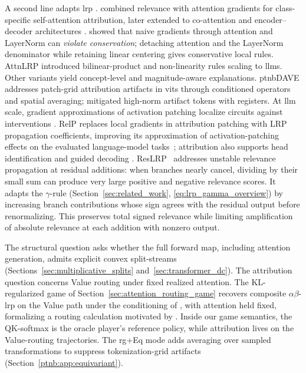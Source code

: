 A second line adapts \ac{lrp} \parencite{Bach2015}. \textcite{Chefer2021GenericAttention} combined relevance with attention gradients for class-specific self-attention attribution, later extended to co-attention and encoder--decoder architectures \parencite{Chefer2021ICCV}. \textcite{Ali2022AttnLRP} showed that naive gradients through attention and LayerNorm can \emph{violate conservation}; detaching attention and the LayerNorm denominator while retaining linear centering gives conservative local rules. AttnLRP \parencite{Achtibat2024AttnLRP} introduced bilinear-product and non-linearity rules scaling to \acp{llm}. Other variants yield concept-level \parencite{Achtibat2023CRP} and magnitude-aware \parencite{vukadin2024abslrp} explanations. \ac{ptnbDAVE} \parencite{Wrobel2024} addresses patch-grid attribution artifacts in \acp{vit} \parencite{Dosovitskiy2021vit} through conditioned operators and spatial averaging; \textcite{darcet2024vision} mitigated high-norm artifact tokens with registers. At \ac{llm} scale, gradient approximations of activation patching \parencite{Syed2024AttributionPatching,Kramar2024AtPStar} localize circuits against interventions \parencite{Hanna2024Faithfulness}. RelP replaces local gradients in attribution patching with LRP propagation coefficients, improving its approximation of activation-patching effects on the evaluated language-model tasks~\parencite{Jafari2025RelP}; attribution also supports head identification and guided decoding \parencite{Kahardipraja2025Atlas,Komorowski2026AGD}.
ResLRP~\parencite[Section~4.1 and Appendix~A.2]{Berend2026ResLRP} addresses unstable relevance propagation at residual additions: when branches nearly cancel, dividing by their small sum can produce very large positive and negative relevance scores. It adapts the $\gamma$-rule (Section~\ref{sec:related_work}, \eqref{eq:lrp_gamma_overview}) by increasing branch contributions whose sign agrees with the residual output before renormalizing. This preserves total signed relevance while limiting amplification of absolute relevance at each addition with nonzero output.

The structural question asks whether the full forward map, including attention generation, admits explicit convex split-streams (Sections~\ref{sec:multiplicative_splits} and~\ref{sec:transformer_dc}). The attribution question concerns Value routing under fixed realized attention. The KL-regularized game of Section~\ref{sec:attention_routing_game} recovers composite $\alpha\beta$-\ac{lrp} on the Value path under the conditioning of \textcite{Ali2022AttnLRP}, with attention held fixed, formalizing a routing calculation motivated by \textcite{Abnar2020attention}. Inside our game semantics, the QK-softmax is the oracle player's reference policy, while attribution lives on the Value-routing trajectories. The \ac{rg}+Eq mode adds averaging over sampled transformations to suppress tokenization-grid artifacts (Section~\ref{ptnb:app:equivariant}).

